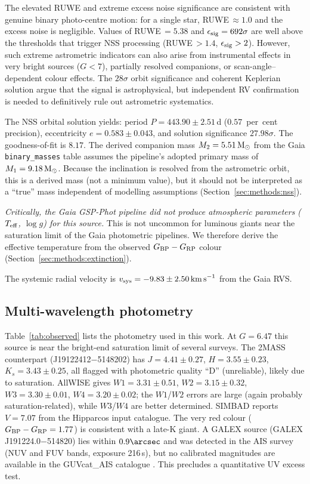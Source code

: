 \documentclass[usenatbib,fleqn]{mnras}
\newcommand{\Msun}{{\rm M}_\odot}
\newcommand{\kms}{{\rm km\,s}^{-1}}
\begin{document}
The elevated RUWE and extreme excess noise significance
are consistent with genuine binary photo-centre motion:
for a single star, RUWE$\,\approx 1.0$ and the excess noise is
negligible.  Values of RUWE$\,= 5.38$ and
$\epsilon_{\rm sig} = 692\sigma$ are well above the thresholds
that trigger NSS processing (RUWE$\,> 1.4$,
$\epsilon_{\rm sig} > 2$).
However, such extreme astrometric indicators can also arise
from instrumental effects in very bright sources ($G < 7$),
partially resolved companions, or scan-angle--dependent
colour effects.  The $28\sigma$ orbit significance and
coherent Keplerian solution argue that the signal is
astrophysical, but independent RV confirmation is needed
to definitively rule out astrometric systematics.

The NSS orbital solution yields:
period $P = 443.90 \pm 2.51$\,d ($0.57$~per~cent precision),
eccentricity $e = 0.583 \pm 0.043$, and solution significance
$27.98\sigma$.  The goodness-of-fit is $8.17$.
The derived companion mass
$M_2 = 5.51\,\Msun$ from the Gaia \texttt{binary\_masses} table
assumes the pipeline's adopted primary mass of
$M_1 = 9.18\,\Msun$.  Because the inclination is resolved from
the astrometric orbit, this is a derived mass (not a minimum
value), but it should not be interpreted as a ``true'' mass
independent of modelling assumptions
(Section~\ref{sec:methods:nss}).

\emph{Critically, the Gaia \mbox{GSP-Phot} pipeline did not produce
atmospheric parameters ($T_{\rm eff}$, $\log g$) for this source.}
This is not uncommon for luminous giants near the saturation limit
of the Gaia photometric pipelines.  We therefore derive the
effective temperature from the observed $G_{\rm BP} - G_{\rm RP}$
colour (Section~\ref{sec:methods:extinction}).

The systemic radial velocity is
$v_{\rm sys} = -9.83 \pm 2.50\,\kms$ from the Gaia RVS.

\subsection{Multi-wavelength photometry}
\label{sec:data:phot}

Table~\ref{tab:observed} lists the photometry used in this work.
At $G = 6.47$ this source is near the bright-end saturation
limit of several surveys.  The 2MASS counterpart
(J19122412$-$5148202) has $J = 4.41 \pm 0.27$,
$H = 3.55 \pm 0.23$, $K_s = 3.43 \pm 0.25$, all flagged
with photometric quality ``D'' (unreliable), likely due to
saturation.  AllWISE gives
$W1 = 3.31 \pm 0.51$, $W2 = 3.15 \pm 0.32$,
$W3 = 3.30 \pm 0.01$, $W4 = 3.20 \pm 0.02$;
the $W1$/$W2$ errors are large (again probably saturation-related),
while $W3$/$W4$ are better determined.
SIMBAD reports $V = 7.07$ from the Hipparcos input catalogue.
The very red colour ($G_{\rm BP} - G_{\rm RP} = 1.77$) is
consistent with a late-K giant.
A GALEX source (GALEX\,J191224.0$-$514820) lies within
$0.9\arcsec$ and was detected in the AIS survey
(NUV and FUV bands, exposure 216\,s), but no calibrated
magnitudes are available in the
GUVcat\_AIS catalogue \citep{Bianchi2017}.
This precludes a quantitative UV excess test.
\end{document}
